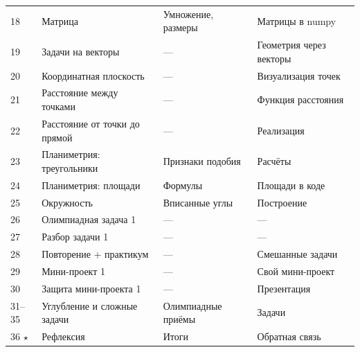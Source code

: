 \documentclass[12pt,a4paper]{article}
\newcommand{\ml}[1]{\textcolor{blue!65!black}{\small #1}}
\begin{document}
\begin{longtable}{C{0.9cm}L{4.3cm}L{4.1cm}L{4.5cm}}
18 & Матрица & Умножение, размеры & \ml{Матрицы в numpy}\\
19 & Задачи на векторы & --- & \ml{Геометрия через векторы}\\
20 & Координатная плоскость & --- & \ml{Визуализация точек}\\
21 & Расстояние между точками & --- & \ml{Функция расстояния}\\
22 & Расстояние от точки до прямой & --- & \ml{Реализация}\\
23 & Планиметрия: треугольники & Признаки подобия & \ml{Расчёты}\\
24 & Планиметрия: площади & Формулы & \ml{Площади в коде}\\
25 & Окружность & Вписанные углы & \ml{Построение}\\
26 & Олимпиадная задача 1 & --- & ---\\
27 & Разбор задачи 1 & --- & ---\\
28 & Повторение + практикум & --- & Смешанные задачи\\
29 & Мини-проект 1 & --- & Свой мини-проект\\
30 & Защита мини-проекта 1 & --- & Презентация\\
31--35 & Углубление и сложные задачи & Олимпиадные приёмы & Задачи\\
36 $\star$ & Рефлексия & Итоги & Обратная связь\\
\midrule


\end{longtable}
\end{document}
